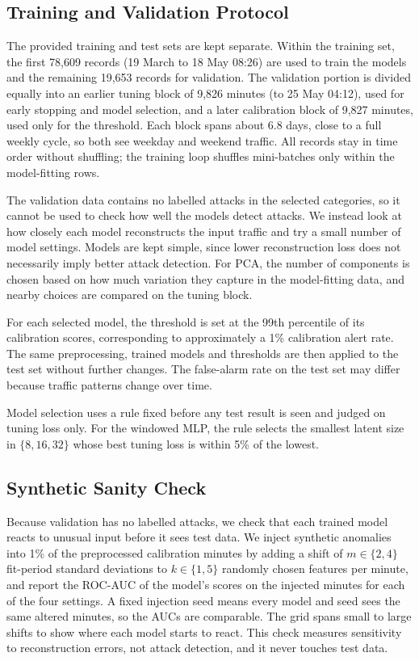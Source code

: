 \documentclass[conference]{IEEEtran}
\begin{document}
\subsection{Training and Validation Protocol}
The provided training and test sets are kept separate. Within the training set, the first 78,609 records (19 March to 18 May 08:26) are used to train the models and the remaining 19,653 records for validation. The validation portion is divided equally into an earlier tuning block of 9,826 minutes (to 25 May 04:12), used for early stopping and model selection, and a later calibration block of 9,827 minutes, used only for the threshold. Each block spans about 6.8 days, close to a full weekly cycle, so both see weekday and weekend traffic. All records stay in time order without shuffling; the training loop shuffles mini-batches only within the model-fitting rows.

The validation data contains no labelled attacks in the selected categories, so it cannot be used to check how well the models detect attacks. We instead look at how closely each model reconstructs the input traffic and try a small number of model settings. Models are kept simple, since lower reconstruction loss does not necessarily imply better attack detection. For PCA, the number of components is chosen based on how much variation they capture in the model-fitting data, and nearby choices are compared on the tuning block.

For each selected model, the threshold is set at the 99th percentile of its calibration scores, corresponding to approximately a 1\% calibration alert rate. The same preprocessing, trained models and thresholds are then applied to the test set without further changes. The false-alarm rate on the test set may differ because traffic patterns change over time.

Model selection uses a rule fixed before any test result is seen and judged on tuning loss only. For the windowed MLP, the rule selects the smallest latent size in $\{8, 16, 32\}$ whose best tuning loss is within 5\% of the lowest.

\subsection{Synthetic Sanity Check}
Because validation has no labelled attacks, we check that each trained model reacts to unusual input before it sees test data. We inject synthetic anomalies into 1\% of the preprocessed calibration minutes by adding a shift of $m \in \{2, 4\}$ fit-period standard deviations to $k \in \{1, 5\}$ randomly chosen features per minute, and report the ROC-AUC of the model's scores on the injected minutes for each of the four settings. A fixed injection seed means every model and seed sees the same altered minutes, so the AUCs are comparable. The grid spans small to large shifts to show where each model starts to react. This check measures sensitivity to reconstruction errors, not attack detection, and it never touches test data.
\end{document}
